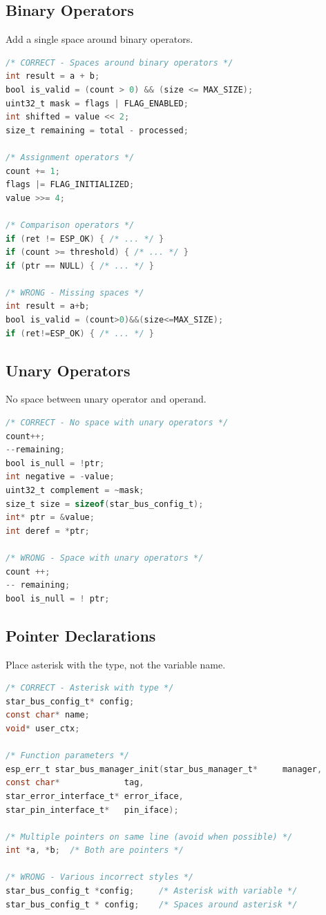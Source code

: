 \subsection{Binary Operators}

Add a single space around binary operators.

\begin{lstlisting}[language=C]
/* CORRECT - Spaces around binary operators */
int result = a + b;
bool is_valid = (count > 0) && (size <= MAX_SIZE);
uint32_t mask = flags | FLAG_ENABLED;
int shifted = value << 2;
size_t remaining = total - processed;

/* Assignment operators */
count += 1;
flags |= FLAG_INITIALIZED;
value >>= 4;

/* Comparison operators */
if (ret != ESP_OK) { /* ... */ }
if (count >= threshold) { /* ... */ }
if (ptr == NULL) { /* ... */ }

/* WRONG - Missing spaces */
int result = a+b;
bool is_valid = (count>0)&&(size<=MAX_SIZE);
if (ret!=ESP_OK) { /* ... */ }
\end{lstlisting}

\subsection{Unary Operators}

No space between unary operator and operand.

\begin{lstlisting}[language=C]
/* CORRECT - No space with unary operators */
count++;
--remaining;
bool is_null = !ptr;
int negative = -value;
uint32_t complement = ~mask;
size_t size = sizeof(star_bus_config_t);
int* ptr = &value;
int deref = *ptr;

/* WRONG - Space with unary operators */
count ++;
-- remaining;
bool is_null = ! ptr;
\end{lstlisting}

\subsection{Pointer Declarations}

Place asterisk with the type, not the variable name.

\begin{lstlisting}[language=C]
/* CORRECT - Asterisk with type */
star_bus_config_t* config;
const char* name;
void* user_ctx;

/* Function parameters */
esp_err_t star_bus_manager_init(star_bus_manager_t*     manager,
const char*             tag,
star_error_interface_t* error_iface,
star_pin_interface_t*   pin_iface);

/* Multiple pointers on same line (avoid when possible) */
int *a, *b;  /* Both are pointers */

/* WRONG - Various incorrect styles */
star_bus_config_t *config;     /* Asterisk with variable */
star_bus_config_t * config;    /* Spaces around asterisk */
\end{lstlisting}

